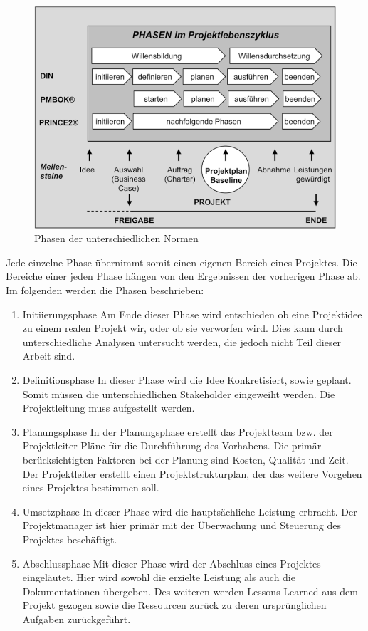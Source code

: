 	\begin{figure}[h]
		\centering
		\includegraphics[width=15cm]{img/Projektlebenszyklus.png}
		\caption{Phasen der unterschiedlichen Normen\cite[15]{Meyer2020}}
		\label{img:phasen}
	\end{figure}

	Jede einzelne Phase übernimmt somit einen eigenen Bereich eines Projektes. Die Bereiche einer jeden Phase hängen von den Ergebnissen der vorherigen Phase ab\autocite[16]{Meyer2020}. Im folgenden werden die Phasen beschrieben: 
	
	\begin{enumerate}
		\item Initiierungsphase	
			\subitem Am Ende dieser Phase wird entschieden ob eine Projektidee zu einem realen Projekt wir, oder ob sie verworfen wird. Dies kann durch unterschiedliche Analysen untersucht werden, die jedoch nicht Teil dieser Arbeit sind.
			
		\item Definitionsphase
			\subitem In dieser Phase wird die Idee Konkretisiert, sowie geplant. Somit müssen die unterschiedlichen Stakeholder eingeweiht werden. Die Projektleitung muss aufgestellt werden. 
		\item Planungsphase
			\subitem In der Planungsphase erstellt das Projektteam bzw. der Projektleiter Pläne für die Durchführung des Vorhabens. Die primär berücksichtigten Faktoren bei der Planung sind Kosten, Qualität und Zeit. Der Projektleiter erstellt einen Projektstrukturplan, der das weitere Vorgehen eines Projektes bestimmen soll. 
		\item Umsetzphase
			\subitem In dieser Phase wird die hauptsächliche Leistung erbracht. Der Projektmanager ist hier primär mit der Überwachung und Steuerung des Projektes beschäftigt. 
		\item Abschlussphase
			\subitem Mit dieser Phase wird der Abschluss eines Projektes eingeläutet. Hier wird sowohl die erzielte Leistung als auch die Dokumentationen übergeben. Des weiteren werden Lessons-Learned aus dem Projekt gezogen sowie die Ressourcen zurück zu deren ursprünglichen Aufgaben zurückgeführt. 
						
	\end{enumerate}


